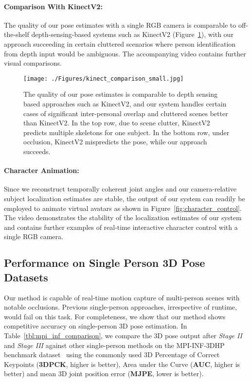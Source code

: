 \documentclass[acmtog,authorversion]{acmart}
\begin{document}
\paragraph{Comparison With KinectV2:}
The quality of our pose estimates with a single RGB camera is comparable to off-the-shelf depth-sensing-based systems such as KinectV2 (Figure~\ref{fig:kinect_comparisons}), with our approach succeeding in certain cluttered scenarios where person identification from depth input would be ambiguous. The accompanying video contains further visual comparisons.
\begin{figure}[t]
  \texttt{[image: ./Figures/kinect\_comparison\_small.jpg]}
  \caption
  {The quality of our pose estimates is comparable to depth sensing based approaches such as KinectV2, and our system handles certain cases of significant inter-personal overlap and cluttered scenes better than KinectV2. In the top row, due to scene clutter, KinectV2 predicts multiple skeletons for one subject. 
In the bottom row, under occlusion, KinectV2 mispredicts the pose, while our approach succeeds.}
  \label{fig:kinect_comparisons}
  \vspace{-0.4cm}
\end{figure}

\paragraph{Character Animation:}
Since we reconstruct temporally coherent joint angles and our camera-relative subject localization estimates are stable, the output of our system can readily be employed to animate virtual avatars as shown in Figure~\ref{fig:character_control}. The video demonstrates the stability of the localization estimates of our system and contains further examples of real-time interactive character control with a single RGB camera.


\subsection{Performance on Single Person 3D Pose Datasets}
\label{res:single_person}
Our method is capable of real-time motion capture of multi-person scenes with notable occlusions. Previous single-person approaches, irrespective of runtime, would fail on this task. 
For completeness, we show that our method shows competitive accuracy on single-person 3D pose estimation. In Table~\ref{tbl:mpi_inf_comparison}, we compare the 3D pose output after \textit{Stage II} and \textit{Stage III} against other single-person methods on the MPI-INF-3DHP benchmark dataset~\cite{mehta_mono_3dv17} using the commonly used 3D Percentage of Correct Keypoints (\textbf{3DPCK}, higher is better), Area under the Curve (\textbf{AUC}, higher is better) and mean 3D joint position error (\textbf{MJPE}, lower is better). 
\end{document}
